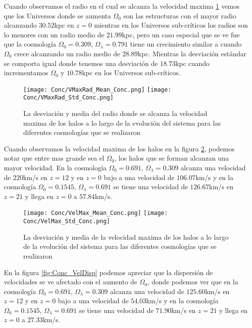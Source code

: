 Cuando observamos el radio en el cual se alcanza la velocidad maxima \ref{fig:Conc_VMaxRad} vemos que los Universos donde se aumenta $\Omega_0$ son las estructuras con el mayor radio alcanzando $30.52$kpc en $z=0$ mientras en los Universos sub-críticos los radios son lo menores con un radio medio de $21.99$kpc, pero un caso especial que se ve fue que la cosmología $\Omega_0 =0.309$, $\Omega_\lambda=0.791$ tiene un crecimiento similar a cuando $\Omega_0$ crece alcanzando  un radio medio de $28.89$kpc. Mientras la desviación estándar se comporta igual donde tenemos una desviación de $18.73$kpc cuando incrementamos $\Omega_0$ y $10.78$kpc en los Universos sub-críticos.

\begin{figure}[H]
      \centering
      \texttt{[image: Conc/VMaxRad\_Mean\_Conc.png]}
      \texttt{[image: Conc/VMaxRad\_Std\_Conc.png]}
      \caption[Evolución de la desviación y media del radio donde se alcanza la velocidad maxima de los halos para todas las cosmologías]{La desviación y media del radio donde se alcanza la velocidad maxima de los halos a lo largo de la evolución del sistema para las diferentes cosmologías que se realizaron}
      \label{fig:Conc_VMaxRad}
\end{figure}

Cuando observamos la velocidad maxima de los halos en la figura \ref{fig:Conc_VelMax}, podemos notar que entre mas grande sea el $\Omega_0$, los halos que se forman alcanzan una mayor velocidad. En la cosmología $\Omega_0 = 0.691$, $\Omega_\lambda = 0.309$ alcanza una velocidad de $220$km/s en $z=12$ y en $z=0$ bajo a una velocidad de $106.07$km/s y en la cosmología  $\Omega_0 = 0.1545$, $\Omega_\lambda = 0.691$ se tiene una velocidad de $126.67$km/s en $z=21$ y llega en $z=0$ a $57.84$km/s.

\begin{figure}[H]
      \centering
      \texttt{[image: Conc/VelMax\_Mean\_Conc.png]}
      \texttt{[image: Conc/VelMax\_Std\_Conc.png]}
      \caption[Evolución de la desviación y media de la velocidad maxima de los halos para todas las cosmologías]{La desviación y media de la velocidad maxima de los halos a lo largo de la evolución del sistema para las diferentes cosmologías que se realizaron}
      \label{fig:Conc_VelMax}
\end{figure}

En la figura \ref{fig:Conc_VelDisp} podemos apreciar que la dispersión de velocidades se ve afectado con el aumento de $\Omega_0$, donde podemos ver que en la cosmología $\Omega_0 = 0.691$, $\Omega_\lambda = 0.309$ alcanza una velocidad de $125.60$km/s en $z=12$ y en $z=0$ bajo a una velocidad de $54.03$km/s y en la cosmología  $\Omega_0 = 0.1545$, $\Omega_\lambda = 0.691$ se tiene una velocidad de $71.90$km/s en $z=21$ y llega en $z=0$ a $27.33$km/s. 

